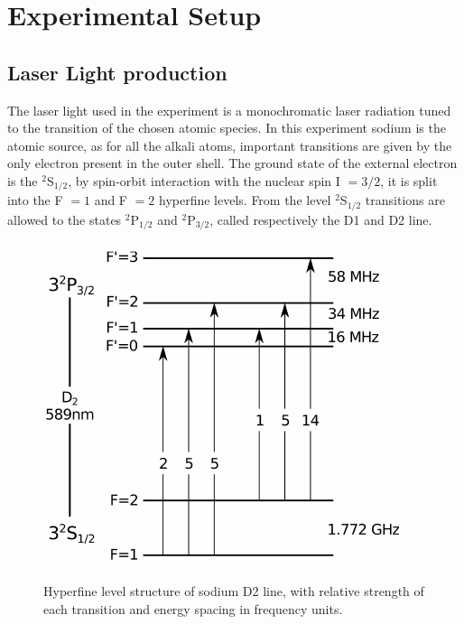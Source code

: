 \documentclass[../thesis.tex]{subfiles}
\begin{document}
\chapter{Experimental Setup}

\section{Laser Light production}

The laser light used in the experiment is a monochromatic laser radiation tuned to the transition of the chosen atomic species. In this experiment sodium is the atomic source, as for all the alkali atoms, important transitions are given by the only electron present in the outer shell. The ground state of the external electron is the $^2$S$_{1/2}$, by spin-orbit interaction with the nuclear spin I $= 3/2$, it is split into the F $=1$ and F $=2$ hyperfine levels.
From the level $^2$S$_{1/2}$ transitions are allowed to the states $^2$P$_{1/2}$ and $^2$P$_{3/2}$, called respectively the D1 and D2 line.\\

\begin{figure}[!htb]
\centering
\includegraphics[scale=1]{d2_levstr.pdf}
\caption{Hyperfine level structure of sodium D2 line, with relative strength of each transition and energy spacing in frequency units.}
\label{fig:d2line}
\end{figure}
\end{document}
